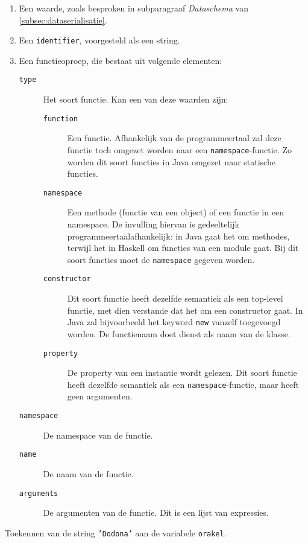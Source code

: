 \begin{enumerate}
    \item Een waarde, zoals besproken in subparagraaf \emph{Dataschema} van \cref{subsec:dataserialisatie}.
    \item Een \texttt{identifier}, voorgesteld als een string.
    \item Een functieoproep, die bestaat uit volgende elementen:
    \begin{description}
        \item[\texttt{type}] Het soort functie.
        Kan een van deze waarden zijn:
        \begin{description}
            \item[\texttt{function}]
            Een  functie.
            Afhankelijk van de programmeertaal zal deze functie toch omgezet worden naar een \texttt{namespace}-functie.
            Zo worden dit soort functies in Java omgezet naar statische functies.
            \item[\texttt{namespace}]
            Een methode (functie van een object) of een functie in een namespace.
            De invulling hiervan is gedeeltelijk programmeertaalafhankelijk: in Java gaat het om methodes, terwijl het in Haskell om functies van een module gaat.
            Bij dit soort functies moet de \texttt{namespace} gegeven worden.
            \item[\texttt{constructor}]
            Dit soort functie heeft dezelfde semantiek als een top-level functie, met dien verstande dat het om een constructor gaat.
            In Java zal bijvoorbeeld het keyword \texttt{new} vanzelf toegevoegd worden.
            De functienaam doet dienst als naam van de klasse.
            \item[\texttt{property}]
            De property van een instantie wordt gelezen.
            Dit soort functie heeft dezelfde semantiek als een \texttt{namespace}-functie, maar heeft geen argumenten.
        \end{description}
        \item[\texttt{namespace}] De namespace van de functie.
        \item[\texttt{name}] De naam van de functie.
        \item[\texttt{arguments}] De argumenten van de functie.
        Dit is een lijst van expressies.
    \end{description}
\end{enumerate}

\begin{listing}[h]
    \caption{Toekennen van de string \texttt{'Dodona'} aan de variabele \texttt{orakel}.}
    \label{lst:assign-variable}
    \inputminted{json}{code/testplan-assignment.json}
\end{listing}

